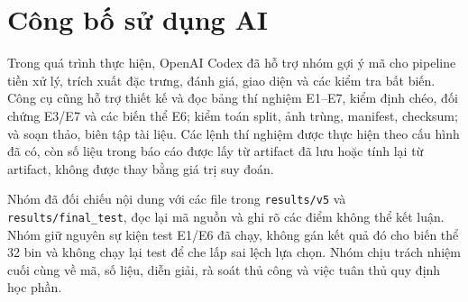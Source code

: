 \chapter*{Công bố sử dụng AI}
Trong quá trình thực hiện, OpenAI Codex đã hỗ trợ nhóm gợi ý mã cho pipeline tiền xử lý, trích xuất đặc trưng, đánh giá, giao diện và các kiểm tra bất biến. Công cụ cũng hỗ trợ thiết kế và đọc bảng thí nghiệm E1--E7, kiểm định chéo, đối chứng E3/E7 và các biến thể E6; kiểm toán split, ảnh trùng, manifest, checksum; và soạn thảo, biên tập tài liệu. Các lệnh thí nghiệm được thực hiện theo cấu hình đã có, còn số liệu trong báo cáo được lấy từ artifact đã lưu hoặc tính lại từ artifact, không được thay bằng giá trị suy đoán.

Nhóm đã đối chiếu nội dung với các file trong \texttt{results/v5} và \texttt{results/final\_test}, đọc lại mã nguồn và ghi rõ các điểm không thể kết luận. Nhóm giữ nguyên sự kiện test E1/E6 đã chạy, không gán kết quả đó cho biến thể 32 bin và không chạy lại test để che lấp sai lệch lựa chọn. Nhóm chịu trách nhiệm cuối cùng về mã, số liệu, diễn giải, rà soát thủ công và việc tuân thủ quy định học phần.
